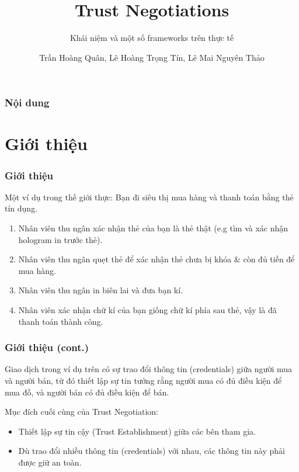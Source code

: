 \documentclass[11pt]{beamer}
\begin{document}
\author{Trần Hoàng Quân, Lê Hoàng Trọng Tín, Lê Mai Nguyên Thảo}
\title{Trust Negotiations}
\subtitle{Khái niệm và một số frameworks trên thực tế}
\begin{frame}[plain]
	\maketitle
\end{frame}

\begin{frame}
\frametitle{Nội dung}
\tableofcontents
\end{frame}

\section{Giới thiệu}
\begin{frame}
\frametitle{Giới thiệu}
Một ví dụ trong thế giới thực: Bạn đi siêu thị mua hàng và thanh toán bằng thẻ tín dụng.
\begin{enumerate}
\item Nhân viên thu ngân xác nhận thẻ của bạn là thẻ thật (e.g tìm và xác nhận hologram in trước thẻ).
\item Nhân viên thu ngân quẹt thẻ để xác nhận thẻ chưa bị khóa \& còn đủ tiền để mua hàng.
\item Nhân viên thu ngân in biên lai và đưa bạn kí.
\item Nhân viên xác nhận chữ kí của bạn giống chữ kí phía sau thẻ, vậy là đã thanh toán thành công.
\end{enumerate}
\end{frame}

\begin{frame}
\frametitle{Giới thiệu (cont.)}
Giao dịch trong ví dụ trên có sự trao đổi thông tin (credentials) giữa người mua và người bán, từ đó thiết lập sự tin tưởng rằng người mua có đủ điều kiện để mua đồ, và người bán có đủ điều kiện để bán.

Mục đích cuối cùng của Trust Negotiation:
\begin{itemize}
\item Thiết lập sự tin cậy (Trust Establishment) giữa các bên tham gia.
\item Dù trao đổi nhiều thông tin (credentials) với nhau, các thông tin này phải được giữ an toàn.
\end{itemize}
\end{frame}
\end{document}
